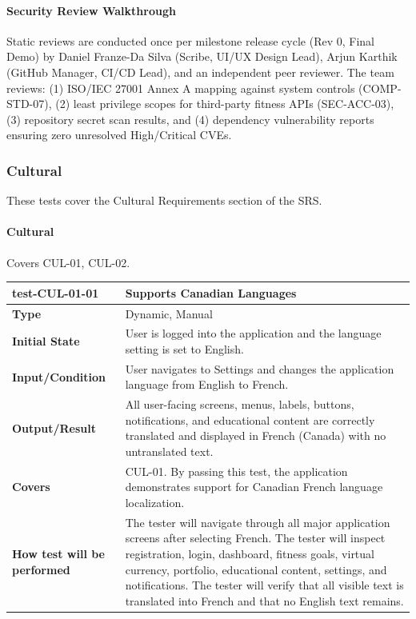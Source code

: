 \documentclass[12pt, titlepage]{article}
\begin{document}
\paragraph{Security Review Walkthrough}

Static reviews are conducted once per milestone release cycle (Rev 0, Final Demo) by Daniel Franze-Da Silva (Scribe, UI/UX Design Lead), Arjun Karthik (GitHub Manager, CI/CD Lead), and an independent peer reviewer. The team reviews: (1) ISO/IEC 27001 Annex A mapping against system controls (COMP-STD-07), (2) least privilege scopes for third-party fitness APIs (SEC-ACC-03), (3) repository secret scan results, and (4) dependency vulnerability reports ensuring zero unresolved High/Critical CVEs.

\subsubsection{Cultural}

These tests cover the Cultural Requirements section of the SRS.

\paragraph{Cultural}

Covers CUL-01, CUL-02.

\noindent\begin{tabularx}{\textwidth}{>{\raggedright\arraybackslash}p{3.5cm}X}
  \toprule
  \textbf{test-CUL-01-01} & \textbf{Supports Canadian Languages}\\
  \midrule
  \textbf{Type} & Dynamic, Manual\\
  \textbf{Initial State} & User is logged into the application and the language setting is set to English.\\
  \textbf{Input/Condition} & User navigates to Settings and changes the application language from English to French.\\
  \textbf{Output/Result} & All user-facing screens, menus, labels, buttons, notifications, and educational content are correctly translated and displayed in French (Canada) with no untranslated text.\\
  \textbf{Covers} & CUL-01. By passing this test, the application demonstrates support for Canadian French language localization.\\
  \textbf{How test will be performed} & The tester will navigate through all major application screens after selecting French. The tester will inspect registration, login, dashboard, fitness goals, virtual currency, portfolio, educational content, settings, and notifications. The tester will verify that all visible text is translated into French and that no English text remains.\\
  \bottomrule
\end{tabularx}
\end{document}

